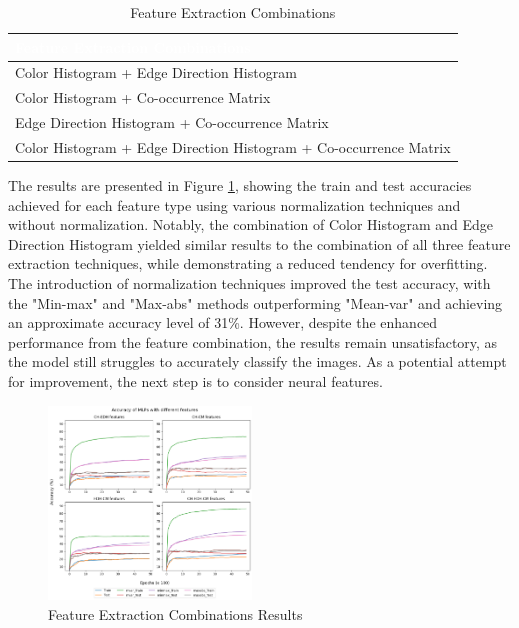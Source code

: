 \documentclass{article}
\begin{document}
\begin{multicols}{2}
    \begin{table}[H]
        \small
        \centering
        \renewcommand{\arraystretch}{1.5}
        \begin{tabular}{|p{7.8cm}|}
        \rowcolor{blue}
        \hline
        \textcolor{white}{\textbf{Feature Extraction Combinations}} \\
        \hline
        \rowcolor{blue!15}
        Color Histogram + Edge Direction Histogram  \\
        \rowcolor{white}
        Color Histogram + Co-occurrence Matrix \\
        \rowcolor{blue!15}
        Edge Direction Histogram + Co-occurrence Matrix \\
        \rowcolor{white}
        Color Histogram + Edge Direction Histogram + Co-occurrence Matrix  \\
        \hline
        \end{tabular}
        \caption{Feature Extraction Combinations}
        \label{tab:feature_combinations}
    \end{table}
\noindent
The results are presented in Figure \ref{fig:comb_results}, showing the train and test accuracies achieved for each feature type using various normalization techniques and without normalization. 
Notably, the combination of Color Histogram and Edge Direction Histogram yielded similar results to the combination of all three feature extraction techniques, while demonstrating 
a reduced tendency for overfitting. The introduction of normalization techniques improved the test accuracy, with the "Min-max" and "Max-abs" methods outperforming "Mean-var" and achieving 
an approximate accuracy level of 31\%. However, despite the enhanced performance from the feature combination, the results remain unsatisfactory, as the model still struggles to 
accurately classify the images. As a potential attempt for improvement, the next step is to consider neural features.

    \begin{figure}[H]
        \centering
        \includegraphics[width=0.48\textwidth]{comb_results.png}
        \caption{Feature Extraction Combinations Results}
        \label{fig:comb_results}
    \end{figure}




\end{multicols}
\end{document}
